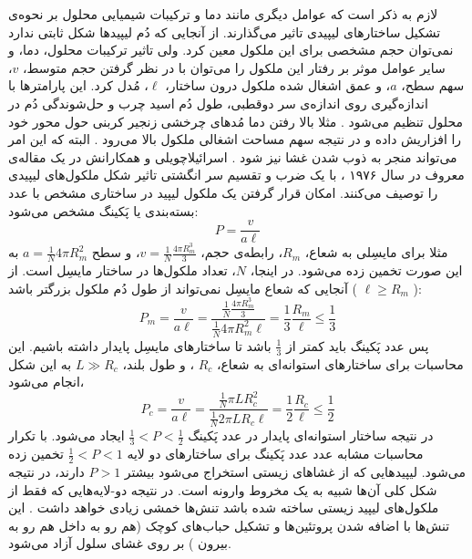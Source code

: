 لازم به ذکر است که عوامل دیگری مانند دما و ترکیبات شیمیایی محلول بر نحوه‌ی تشکیل ساختار‌های لیپیدی تاثیر می‌گذارند. از آنجایی که دُم لیپید‌ها شکل ثابتی ندارد نمی‌توان حجم مشخصی برای این ملکول معین کرد. ولی تاثیر ترکیبات محلول، دما، و سایر عوامل موثر بر رفتار این ملکول را می‌توان با در نظر گرفتن حجم متوسط،
$v$، سهم سطح، 
$a$، و عمق اشغال شده ملکول درون ساختار،
$\ell$، مُدل کرد. این پارامتر‌ها با اندازه‌گیری روی اندازه‌ی سر دوقطبی، طول د‌ُم اسید چرب و حل‌شوندگی دُم در محلول تنظیم می‌شود
\cite{LifeAsaMatterofFat2005}. مثلا بالا رفتن دما  مُد‌های چرخشی زنجیر کربنی حول محور خود را افزاریش داده و در نتیجه سهم مساحت اشغالی ملکول بالا می‌رود
\cite{BiomembranesBook1989}. البته که این امر می‌تواند منجر به ذوب شدن غشا نیز شود
\cite{BioMemBook2007}.
 اسرائیلاچویلی
و همکارانش در یک مقاله‌ی معروف در سال ۱۹۷۶
\cite{Israelachvili1976}، با یک ضرب و تقسیم سر انگشتی تاثیر شکل ملکول‌های لیپیدی را توصیف می‌کنند. امکان قرار گرفتن یک ملکول لیپید در ساختاری مشخص با عدد بسته‌بندی یا پَکینگ
مشخص می‌شود:
\begin{equation}
P=\frac{v}{a\ell}
\end{equation}
مثلا برای مایسِلی به شعاع، 
$R_m$، رابطه‌ی حجم، 
$v=\frac{1}{N}\frac{4\pi R_m^3}{3}$، و سطح 
$a=\frac{1}{N}4\pi R_m^2$ 
به این صورت تخمین زده می‌شود. در اینجا،
$N$، تعداد ملکول‌ها در ساختار مایسِل است. از آنجایی که شعاع مایسِل نمی‌تواند از طول دُم ملکول بزرگتر باشد (
$\ell\geq R_m$
):
\begin{equation}
P_m=\frac{v}{a\ell}=\frac{\frac{1}{N}\frac{4\pi R_m^3}{3}}{\frac{1}{N}4\pi R_m^2\ell}=\frac{1}{3}\frac{R_m}{\ell}\leq\frac{1}{3}
\end{equation}
پس عدد پَکینگ باید کمتر از 
$\frac{1}{3}$
باشد تا ساختار‌‌های مایسِل پایدار داشته باشیم. این محاسبات برای  ساختارهای استوانه‌ای به شعاع، 
$R_c$
، و طول بلند، 
$L\gg R_c$
به این شکل انجام می‌شود،
\begin{equation}
P_c=\frac{v}{a\ell}=\frac{\frac{1}{N}\pi LR_c^2}{\frac{1}{N}2\pi LR_c\ell}=\frac{1}{2}\frac{R_c}{\ell}\leq\frac{1}{2}
\end{equation}
در نتیجه ساختار استوانه‌ای پایدار در عدد پَکینگ 
$\frac{1}{3}<P<\frac{1}{2}$
ایجاد می‌شود. با تکرار محاسبات مشابه عدد عدد پَکینگ برای ساختار‌های دو لایه
$\frac{1}{2}<P<1$
تخمین زده می‌شود. لیپید‌هایی که از غشاهای زیستی استخراج می‌شود بیشتر 
$P>1$
دارند، در نتیجه‌ شکل کلی آن‌ها شبیه به یک مخروط وارونه است. در نتیجه دو-لایه‌هایی که فقط از ملکول‌های لیپید زیستی ساخته شده باشد تنش‌ها خمشی زیادی خواهد داشت
\cite{Mouritsen2011,Membraneasamatteroffat}. این تنش‌ها با اضافه شدن پروتئین‌ها و تشکیل حباب‌های کوچک (هم رو به داخل
  هم رو به بیرون
 ) بر روی غشای سلول آزاد می‌شود.



